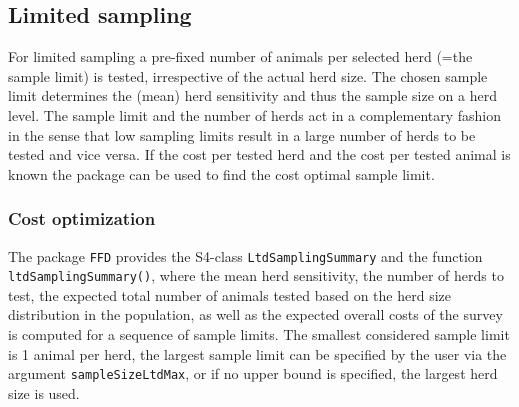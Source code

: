 \documentclass[nojss]{jss}
\begin{document}

\subsection{Limited sampling} 
\label{subsec:ltd-sampling} 

For limited sampling a pre-fixed number of animals per selected herd 
(=the sample limit) is tested, irrespective of the actual herd size. 
The chosen sample limit determines the (mean) herd sensitivity and 
thus the sample size on a herd level. The sample limit and the 
number of herds act in a complementary fashion in the sense that low 
sampling limits result in a large number of herds to be tested and 
vice versa. If the cost per tested herd and the cost per tested 
animal is known the package can be used to find the cost optimal 
sample limit. 

\subsubsection{Cost optimization}

The package \texttt{FFD} provides the S4-class 
\texttt{LtdSamplingSummary} 
 and the function 
\texttt{ltdSamplingSummary()},  
where the mean herd sensitivity, the number of herds to test, the 
expected total number of animals tested based on the herd size 
distribution in the population, as well as the expected overall 
costs of the survey is computed for a sequence of sample limits. The 
smallest considered sample limit is 1 animal per herd, the largest 
sample limit can be specified by the user via the argument 
\texttt{sampleSizeLtdMax}, or if no upper bound is specified, the 
largest herd size is used. 
\end{document}
